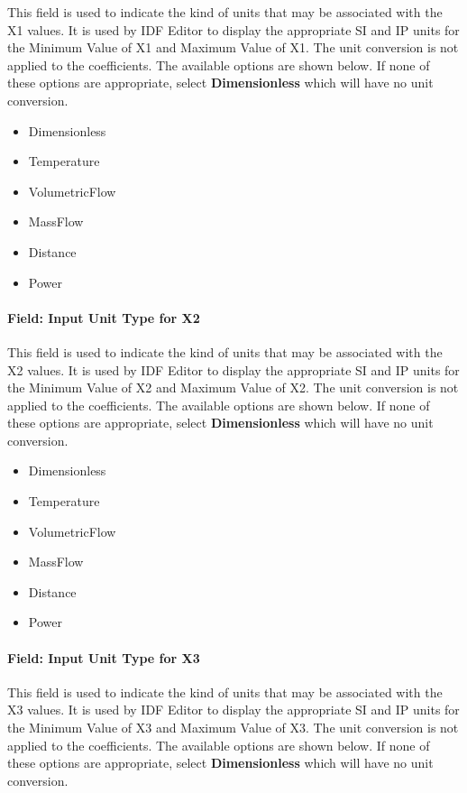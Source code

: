 This field is used to indicate the kind of units that may be associated with the X1 values. It is used by IDF Editor to display the appropriate SI and IP units for the Minimum Value of X1 and Maximum Value of X1. The unit conversion is not applied to the coefficients. The available options are shown below. If none of these options are appropriate, select \textbf{Dimensionless} which will have no unit conversion.

\begin{itemize}
\item
  Dimensionless
\item
  Temperature
\item
  VolumetricFlow
\item
  MassFlow
\item
  Distance
\item
  Power
\end{itemize}

\paragraph{Field: Input Unit Type for X2}\label{field-input-unit-type-for-x2}

This field is used to indicate the kind of units that may be associated with the X2 values. It is used by IDF Editor to display the appropriate SI and IP units for the Minimum Value of X2 and Maximum Value of X2. The unit conversion is not applied to the coefficients. The available options are shown below. If none of these options are appropriate, select \textbf{Dimensionless} which will have no unit conversion.

\begin{itemize}
\item
  Dimensionless
\item
  Temperature
\item
  VolumetricFlow
\item
  MassFlow
\item
  Distance
\item
  Power
\end{itemize}

\paragraph{Field: Input Unit Type for X3}\label{field-input-unit-type-for-x3}

This field is used to indicate the kind of units that may be associated with the X3 values. It is used by IDF Editor to display the appropriate SI and IP units for the Minimum Value of X3 and Maximum Value of X3. The unit conversion is not applied to the coefficients. The available options are shown below. If none of these options are appropriate, select \textbf{Dimensionless} which will have no unit conversion.

